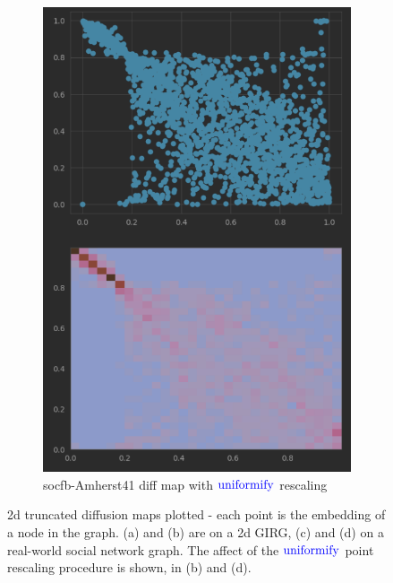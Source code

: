 \begin{figure}
\begin{subfigure}{0.45\textwidth}
      \includegraphics[width=\linewidth]{figures/real_diffmap_plot_uniformed.png}
      \caption{socfb-Amherst41 diff map with $\operatorname{\textcolor{blue}{uniformify}}$ rescaling}
      \label{fig:sub4}
    \end{subfigure}
    \caption{
      2d truncated diffusion maps plotted - each point is the embedding of a node in the graph. (a) and (b) are on a 2d GIRG, (c) and (d) on a real-world social network graph. The affect of the $\operatorname{\textcolor{blue}{uniformify}}$ point rescaling procedure is shown, in (b) and (d).}
    \label{fig:diffmap_uniformed_vs_nonuniformed}
\end{figure}




